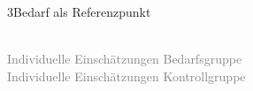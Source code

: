 \documentclass[xcolor=table,9pt,aspectratio=169]{beamer}
\begin{document}
\begin{frame}{\vspace*{10mm}3\hspace*{1em}Bedarf als Referenzpunkt}
\begin{multicols}{2}
   \begin{center}
      \\
      \textcolor{gray}{Individuelle Einschätzungen Bedarfsgruppe}
      \\
      \textcolor{gray}{Individuelle Einschätzungen Kontrollgruppe}
   \end{center}
\end{multicols}
\end{frame}
\end{document}
